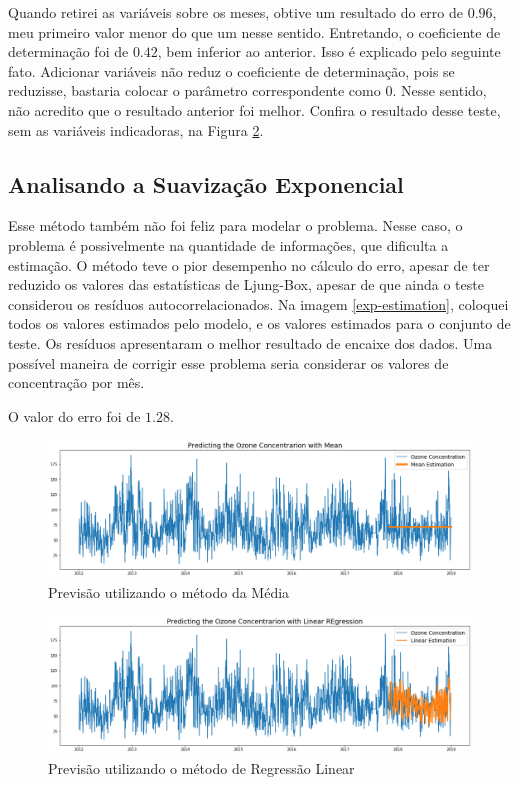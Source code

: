 Quando retirei as variáveis sobre os meses, obtive um resultado do erro de
$0.96$, meu primeiro valor menor do que um nesse sentido. Entretando, o
coeficiente de determinação foi de $0.42$, bem inferior ao anterior. Isso é
explicado pelo seguinte fato. Adicionar variáveis não reduz o coeficiente de
determinação, pois se reduzisse, bastaria colocar o parâmetro correspondente
como $0$. Nesse sentido, não acredito que o resultado anterior foi melhor.
Confira o resultado desse teste, sem as variáveis indicadoras, na Figura
\ref{linear-estimation}. 

\subsection{Analisando a Suavização Exponencial}

Esse método também não foi feliz para modelar o problema. Nesse caso, o
problema é possivelmente na quantidade de informações, que dificulta a
estimação. O método teve o pior desempenho no cálculo do erro, apesar de ter
reduzido os valores das estatísticas de Ljung-Box, apesar de que ainda o teste
considerou os resíduos autocorrelacionados. Na imagem \ref{exp-estimation},
coloquei todos os valores estimados pelo modelo, e os valores estimados para o
conjunto de teste. Os resíduos apresentaram o melhor resultado de encaixe dos
dados. Uma possível maneira de corrigir esse problema seria considerar os
valores de concentração por mês. 

O valor do erro foi de $1.28$.

\begin{figure}
    \includegraphics[width=\linewidth]{img/graphic5.png}
    \caption{Previsão utilizando o método da Média}
    \label{mean-estimation}
\end{figure}

\begin{figure}
    \includegraphics[width=\linewidth]{img/graphic6.png}
    \caption{Previsão utilizando o método de Regressão Linear}
    \label{linear-estimation}
\end{figure}

